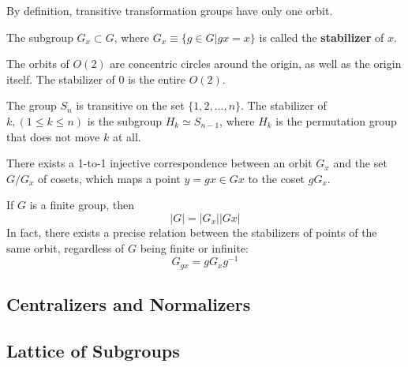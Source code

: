   By definition, transitive transformation groups have only one orbit.

  \begin{definition}
    The subgroup $G_{x} \subset G$, where $G_{x} \equiv \{ g \in G | g x = x\}$ is called the \textbf{stabilizer} of $x$.
  \end{definition}

  \begin{example}
    The orbits of $O(2)$ are concentric circles around the origin, as well as the origin itself. The stabilizer of $0$ is the entire $O(2)$.
  \end{example}

  \begin{example}
    The group $S_n$ is transitive on the set $\{1, 2, ..., n\}$. The stabilizer of $k, (1 \leq k \leq n)$ is the subgroup $H_{k} \simeq S_{n-1}$, where $H_k$ is the permutation group that does not move $k$ at all. 
  \end{example}

  \begin{theorem}
    There exists a 1-to-1 injective correspondence between an orbit $G_x$ and the set $G / G_{x}$ of cosets, which maps a point $y = g x \in G x $ to the coset $g G_x$. 
  \end{theorem}

  \begin{corollary}
    If $G$ is a finite group, then 
    \begin{equation}
      |G| = |G_x| |G x|
    \end{equation}
    In fact, there exists a precise relation between the stabilizers of points of the same orbit, regardless of $G$ being finite or infinite: 
    \begin{equation}
      G_{g x} = g G_{x} g^{-1}
    \end{equation}
  \end{corollary}

\subsection{Centralizers and Normalizers} 

\subsection{Lattice of Subgroups} 

